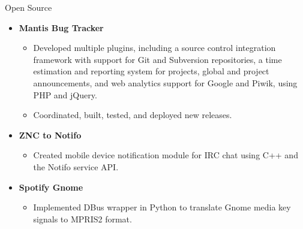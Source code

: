 \documentclass[11pt,oneside]{article}
\newenvironment{ressection}[1]{
	\vspace{8pt}
	{\fontfamily{phv}\selectfont\Large#1}
	\begin{itemize}
	\vspace{3pt}
}{
	\end{itemize}
}
\newcommand{\resitem}[1]{
	\vspace{-4pt}
	\item \begin{flushleft} #1 \end{flushleft}
}
\newcommand{\ressubitem}[1]{
	\vspace{-1pt}
	\item \begin{flushleft} #1 \end{flushleft}
}
\newenvironment{reslist}[1]{
	\resitem{\textbf{#1}}
	\vspace{-2pt}
	\begin{itemize}
}{
	\end{itemize}
}
\begin{document}
\begin{ressection}{Open Source}

	\begin{reslist}{Mantis Bug Tracker}
		\ressubitem{Developed multiple plugins, including a source control integration framework
		with support for Git and Subversion repositories, a time estimation and reporting system for projects,
		global and project announcements, and web analytics support for Google and Piwik, using PHP and jQuery.}
		\ressubitem{Coordinated, built, tested, and deployed new releases.}
	\end{reslist}

	\begin{reslist}{ZNC to Notifo}
		\ressubitem{Created mobile device notification module for IRC chat using C++ and the Notifo service API.}
	\end{reslist}

	\begin{reslist}{Spotify Gnome}
		\ressubitem{Implemented DBus wrapper in Python to translate Gnome media key signals to MPRIS2 format.}
	\end{reslist}


\end{ressection}








\end{document}
